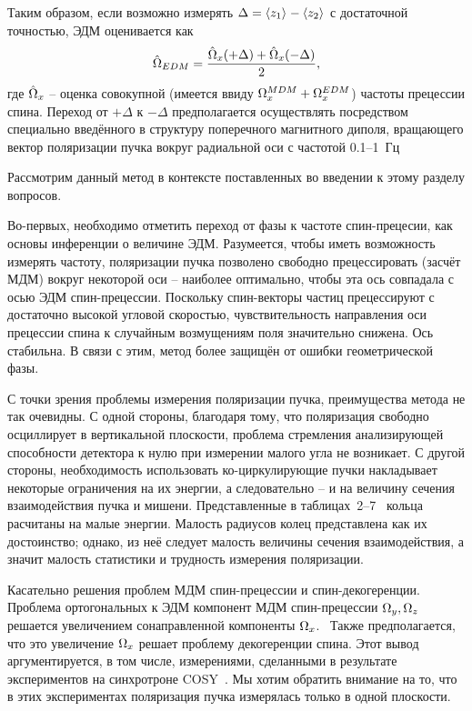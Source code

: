 Таким образом, если возможно измерять $\Delta = \avg{z_1} - \avg{z_2}$ с достаточной точностью, 
ЭДМ оценивается как
\begin{equation}\label{eq:SW:EDM-estimator}
	\hat{\Omega}_{EDM} = \frac{\hat{\Omega}_x(+\Delta) + \hat{\Omega}_x(-\Delta)}{2},
\end{equation}
где $\hat{\Omega}_x$ -- оценка совокупной (имеется ввиду $\Omega_x^{MDM} + \Omega_x^{EDM}$) частоты прецессии спина.
Переход от $+\Delta$ к $-\Delta$ предполагается осуществлять посредством специально введённого
в структуру поперечного магнитного диполя, вращающего вектор поляризации пучка вокруг радиальной оси
с частотой 0.1--1~Гц~\cite[стр.~4]{Koop:SpinWheel2015} 

Рассмотрим данный метод в контексте поставленных во введении к этому разделу вопросов.

Во-первых, необходимо отметить переход от фазы к частоте спин-прецесии, 
как основы инференции о величине ЭДМ. Разумеется, чтобы иметь возможность измерять частоту,
поляризации пучка позволено свободно прецессировать (засчёт МДМ) вокруг некоторой оси -- 
наиболее оптимально, чтобы эта ось совпадала с осью ЭДМ спин-прецессии. Поскольку спин-векторы частиц
прецессируют с достаточно высокой угловой скоростью, чувствительность направления оси прецессии спина
к случайным возмущениям поля значительно снижена. Ось стабильна. В связи с этим, метод более защищён 
от ошибки геометрической фазы.

С точки зрения проблемы измерения поляризации пучка, преимущества метода не так очевидны. 
С одной стороны, благодаря тому, что поляризация свободно осциллирует в вертикальной плоскости, 
проблема стремления анализирующей способности детектора к нулю при измерении малого угла 
не возникает.
С другой стороны, необходимость использовать ко-циркулирующие пучки 
накладывает некоторые ограничения на их энергии, а следовательно -- и на величину
сечения взаимодействия пучка и мишени. Представленные в 
таблицах~2--7~\cite{Koop:SpinWheel2015} кольца расчитаны на малые энергии. 
Малость радиусов колец представлена как их достоинство; однако, из неё следует малость величины
сечения взаимодействия, а значит малость статистики и трудность измерения поляризации. 

Касательно решения проблем МДМ спин-прецессии и спин-декогеренции. 
Проблема ортогональных к ЭДМ компонент МДМ спин-прецессии $\Omega_y, \Omega_z$ решается увеличением 
сонаправленной компоненты $\Omega_x$.~\cite[стр.~5, ур.~(14)]{Koop:SpinWheel2015} 
Также предполагается, что это увеличение $\Omega_x$ решает проблему декогеренции спина. 
Этот вывод аргументируется, в том числе, измерениями, сделанными в результате экспериментов 
на синхротроне COSY~\cite{COSY:DAQ}. Мы хотим обратить внимание на то, что в этих экспериментах
поляризация пучка измерялась только в одной плоскости. 

